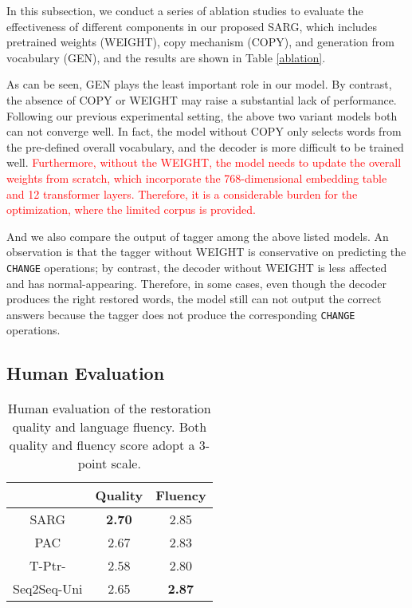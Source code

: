 In this subsection, we conduct a series of ablation studies to evaluate the effectiveness of different components in our proposed SARG, which includes pretrained weights (WEIGHT), copy mechanism (COPY), and generation from vocabulary (GEN), and the results are shown in Table \ref{ablation}. 

As can be seen, GEN plays the least important role in our model. By contrast, the absence of COPY or WEIGHT may raise a substantial lack of performance. Following our previous experimental setting, the above two variant models both can not converge well. In fact, the model without COPY only selects words from the pre-defined overall vocabulary, and the decoder is more difficult to be trained well. \textcolor{red}{Furthermore, without the WEIGHT, the model needs to update the overall weights from scratch, which incorporate the 768-dimensional embedding table and 12 transformer layers. Therefore, it is a considerable burden for the optimization, where the limited corpus is provided.} 

And we also compare the output of tagger among the above listed models. An observation is that the tagger without WEIGHT is conservative on predicting the \texttt{CHANGE} operations; by contrast, the decoder without WEIGHT is less affected and has normal-appearing. Therefore, in some cases, even though the decoder produces the right restored words, the model still can not output the correct answers because the tagger does not produce the corresponding \texttt{CHANGE} operations.


\subsection{Human Evaluation}


\begin{table}[!htb]
	\centering
	\begin{tabular}{|c|c|c|}
		\hline
		& Quality  & Fluency \\ \hline
		SARG & \textbf{2.70} & 2.85 \\ \hline
		PAC & 2.67 & 2.83 \\ \hline
		T-Ptr-& 2.58 & 2.80 \\ \hline
		Seq2Seq-Uni& 2.65 & \textbf{2.87} \\ \hline
	\end{tabular}
	\caption{Human evaluation of the restoration quality and language fluency. Both quality and fluency score adopt a 3-point scale.}\label{human}
\end{table}

